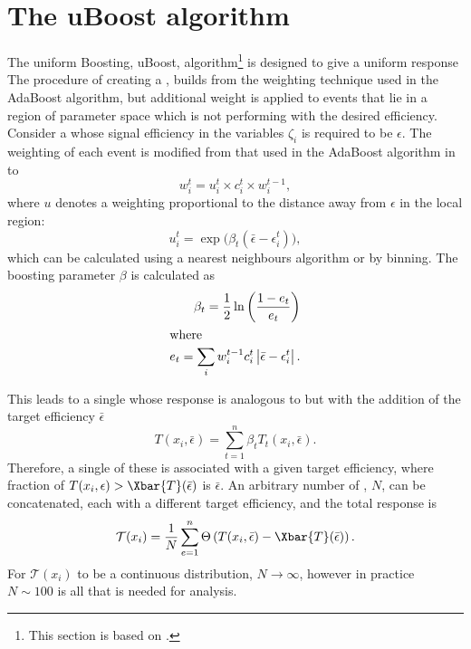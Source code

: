 \section{The uBoost algorithm}
\label{sec:bdt:uboost}
The uniform Boosting, uBoost, algorithm\footnote{
  This section is based on .} is designed to give a uniform
response
The procedure of creating a \uBDT, builds from the weighting technique used in the
AdaBoost algorithm, but additional weight is applied to events that lie in a region of parameter
space which is not performing with the desired efficiency.
Consider a \BDT whose signal efficiency in the variables $\zeta_i$ is required to be $\epsilon$.
The weighting of each event is modified from that used in the AdaBoost algorithm in 
to
\begin{equation}
  w_i^t = u_i^t\times c_i^t \times w_i^{t-1},
\end{equation}
where $u$ denotes a weighting proportional to the distance away from $\epsilon$ in the local
region:
\begin{equation}
  u_i^t = \exp\big(\beta_t(\bar\epsilon-\epsilon_i^t)\big),
\end{equation}
which can be calculated using a nearest neighbours algorithm or by binning.
The boosting parameter $\beta$ is calculated as
\begin{align}
  \beta_t = \frac12\ln\left(\frac{1-e_t}{e_t}\right) \\
  \intertext{where}
  e_t = \sum_i w_i^{t-1}c_i^t\left|\bar\epsilon-\epsilon_i^t\right|.
\end{align}

This leads to a single \BDT whose response is analogous to  but with the addition
of the target efficiency $\bar\epsilon$
\begin{equation}
  T(x_i,\bar\epsilon) = \sum_{t=1}^{n} \beta_tT_t(x_i,\bar\epsilon).
  \label{eq:ada:fullbdt}
\end{equation}
Therefore, a single of these \BDTs is associated with a given target efficiency, where
fraction of $T(x_i,\epsilon)>\Xbar{T}(\bar\epsilon)$ is $\bar\epsilon$.
An arbitrary number of \BDTs, $N$, can be concatenated, each with a different target efficiency, and
the total response is
\begin{equation}
  \mathcal{T}(x_i) =
  \frac1N\sum_{e=1}^{n}\Theta\left(T(x_i, \bar\epsilon) - \Xbar{T}(\bar\epsilon)\right).
\end{equation}
For $\mathcal{T}(x_i)$ to be a continuous distribution, $N\!\to\infty$, however in practice
$N\sim100$ is all that is needed for analysis.

